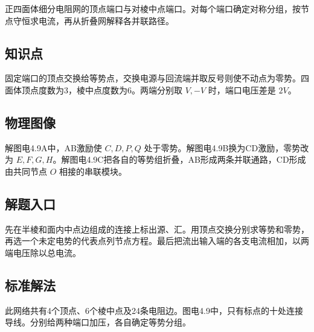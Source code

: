 \documentclass[UTF8,fontset=fandol,a4paper,11pt]{ctexart}
\begin{document}
正四面体细分电阻网的顶点端口与对棱中点端口。对每个端口确定对称分组，按节点守恒求电流，再从折叠网解释各并联路径。



\subsection*{知识点}

固定端口的顶点交换给等势点，交换电源与回流端并取反号则使不动点为零势。四面体顶点度数为3，棱中点度数为6。两端分别取 $V,-V$ 时，端口电压差是 $2V$。



\subsection*{物理图像}

解图电4.9A中，AB激励使 $C,D,P,Q$ 处于零势。解图电4.9B换为CD激励，零势改为 $E,F,G,H$。解图电4.9C把各自的等势组折叠，AB形成两条并联通路，CD形成由共同节点 $O$ 相接的串联模块。



\subsection*{解题入口}

先在半棱和面内中点边组成的连接上标出源、汇。用顶点交换分别求等势和零势，再选一个未定电势的代表点列节点方程。最后把流出输入端的各支电流相加，以两端电压除以总电流。


\subsection*{标准解法}

此网络共有4个顶点、6个棱中点及24条电阻边。图电4.9中，只有标点的十处连接导线。分别给两种端口加压，各自确定等势分组。
\end{document}
